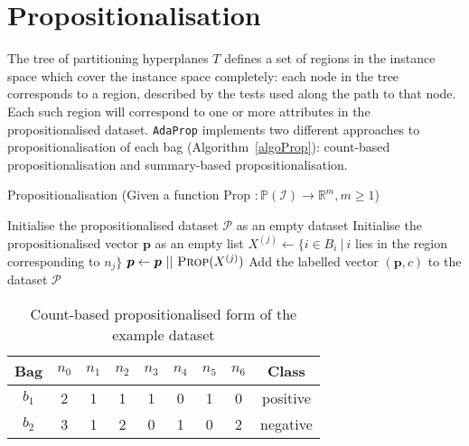 \documentclass[a4paper,12pt]{report} %
\newcommand{\AdaProp}{\texttt{AdaProp}\xspace}
\newcommand{\real}{\mathbb{R}}
\newcommand{\mcl}[1]{\mathcal{#1}}
\newcommand{\power}{\mathbb{P}}
\newcommand{\vect}[1]{\boldsymbol{#1}}
\begin{document}
\section{Propositionalisation}
\label{sec:method:prop}

The tree of partitioning hyperplanes $T$ defines a set of regions in the instance space
	which cover the instance space completely:
each node in the tree corresponds to a region, described by the tests used
	along the path to that node.
Each such region will correspond to one or more attributes 
    in the propositionalised dataset.
\AdaProp implements two different approaches to propositionalisation of each bag
    (Algorithm~\ref{algoProp}):
    count-based propositionalisation and summary-based propositionalisation.


\begin{algorithm}[p]
\caption{Propositionalisation (Given a function {\sc Prop} $: \power(\mcl{I}) \to \real^m, m \geq 1$)}
\label{algoProp} 
    \begin{algorithmic}
    \State Initialise the propositionalised dataset $\mcl{P}$ as an empty dataset
    \ForAll{bags $(B_i,c) \in \mcl{D}$}
        \State Initialise the propositionalised vector $\vect{p}$ as an empty list
            \State $X^{(j)} \gets \{ i \in B_i ~|~ i$ 
                lies in the region corresponding to $n_j \} $
            \State $\vect{p} \gets \vect{p} ~||~ \textrm{\sc Prop}(X^{(j)})$
        \EndFor
        \State Add the labelled vector $(\vect{p},c)$ 
            to the dataset $\mcl{P}$
    \EndFor
    \end{algorithmic}
\end{algorithm}


\begin{table}[p]
\begin{center}
\begin{tabular}{*{9}{c}}
    \toprule
    Bag & $n_0$ & $n_1$ & $n_2$ & $n_3$ & $n_4$ & $n_5$ & $n_6$ & Class \\
    \midrule
    $b_1$ & 2 &     1 & 1 &     1 & 0 & 1 & 0 & positive\\
    $b_2$ & 3 &     1 & 2 &     0 & 1 & 0 & 2 & negative\\
    \bottomrule
    
\end{tabular}
\end{center}
\caption{Count-based propositionalised form of the example dataset}
\label{tEgPropCount}
\end{table}    
\end{document}
